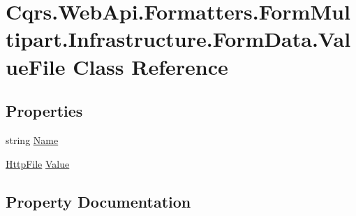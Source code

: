 \hypertarget{classCqrs_1_1WebApi_1_1Formatters_1_1FormMultipart_1_1Infrastructure_1_1FormData_1_1ValueFile}{}\section{Cqrs.\+Web\+Api.\+Formatters.\+Form\+Multipart.\+Infrastructure.\+Form\+Data.\+Value\+File Class Reference}
\label{classCqrs_1_1WebApi_1_1Formatters_1_1FormMultipart_1_1Infrastructure_1_1FormData_1_1ValueFile}
\subsection*{Properties}
\begin{DoxyCompactItemize}
\item 
string \hyperlink{classCqrs_1_1WebApi_1_1Formatters_1_1FormMultipart_1_1Infrastructure_1_1FormData_1_1ValueFile_a2410547f01c8ae8c6d5dd70d3f92284c_a2410547f01c8ae8c6d5dd70d3f92284c}{Name}
\item 
\hyperlink{classCqrs_1_1WebApi_1_1Formatters_1_1FormMultipart_1_1Infrastructure_1_1HttpFile}{Http\+File} \hyperlink{classCqrs_1_1WebApi_1_1Formatters_1_1FormMultipart_1_1Infrastructure_1_1FormData_1_1ValueFile_aebbbefbeda7233acb846f54aaa2f26c2_aebbbefbeda7233acb846f54aaa2f26c2}{Value}
\end{DoxyCompactItemize}


\subsection{Property Documentation}
\mbox{\label{classCqrs_1_1WebApi_1_1Formatters_1_1FormMultipart_1_1Infrastructure_1_1FormData_1_1ValueFile_a2410547f01c8ae8c6d5dd70d3f92284c_a2410547f01c8ae8c6d5dd70d3f92284c}} 
